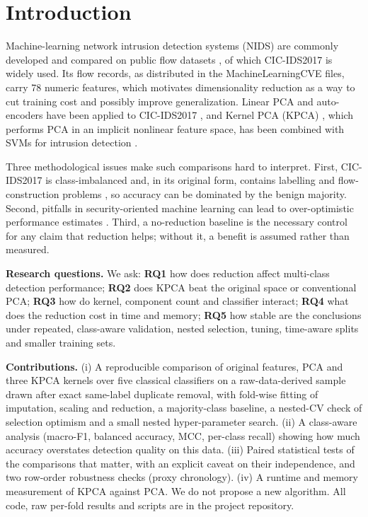 \documentclass[conference]{IEEEtran}
\begin{document}
\section{Introduction}
Machine-learning network intrusion detection systems (NIDS) are commonly developed and compared on public flow datasets \cite{ring2019}, of which CIC-IDS2017 \cite{sharafaldin2018} is widely used. Its flow records, as distributed in the MachineLearningCVE files, carry 78 numeric features, which motivates dimensionality reduction as a way to cut training cost and possibly improve generalization. Linear PCA and auto-encoders have been applied to CIC-IDS2017 \cite{abdulhammed2019}, and Kernel PCA (KPCA) \cite{scholkopf1998}, which performs PCA in an implicit nonlinear feature space, has been combined with SVMs for intrusion detection \cite{kuang2014}.

Three methodological issues make such comparisons hard to interpret. First, CIC-IDS2017 is class-imbalanced and, in its original form, contains labelling and flow-construction problems \cite{engelen2021,panigrahi2018}, so accuracy can be dominated by the benign majority. Second, pitfalls in security-oriented machine learning can lead to over-optimistic performance estimates \cite{arp2022}. Third, a no-reduction baseline is the necessary control for any claim that reduction helps; without it, a benefit is assumed rather than measured.

\textbf{Research questions.} We ask: \textbf{RQ1} how does reduction affect multi-class detection performance; \textbf{RQ2} does KPCA beat the original space or conventional PCA; \textbf{RQ3} how do kernel, component count and classifier interact; \textbf{RQ4} what does the reduction cost in time and memory; \textbf{RQ5} how stable are the conclusions under repeated, class-aware validation, nested selection, tuning, time-aware splits and smaller training sets.

\textbf{Contributions.} (i) A reproducible comparison of original features, PCA and three KPCA kernels over five classical classifiers on a raw-data-derived sample drawn after exact same-label duplicate removal, with fold-wise fitting of imputation, scaling and reduction, a majority-class baseline, a nested-CV check of selection optimism and a small nested hyper-parameter search. (ii) A class-aware analysis (macro-F1, balanced accuracy, MCC, per-class recall) showing how much accuracy overstates detection quality on this data. (iii) Paired statistical tests of the comparisons that matter, with an explicit caveat on their independence, and two row-order robustness checks (proxy chronology). (iv) A runtime and memory measurement of KPCA against PCA. We do not propose a new algorithm. All code, raw per-fold results and scripts are in the project repository.
\end{document}
